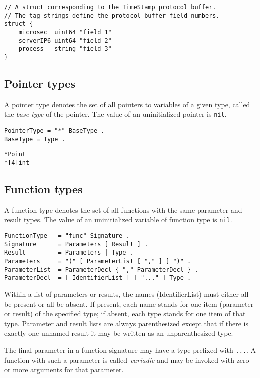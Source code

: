 \begin{Verbatim}[frame=single]
// A struct corresponding to the TimeStamp protocol buffer.
// The tag strings define the protocol buffer field numbers.
struct {
    microsec  uint64 "field 1"
    serverIP6 uint64 "field 2"
    process   string "field 3"
}
\end{Verbatim}

\subsection*{Pointer types}

A pointer type denotes the set of all pointers to variables of a given
type, called the \emph{base type} of the pointer. The value of an
uninitialized pointer is \texttt{nil}.

\begin{Verbatim}[frame=single]
PointerType = "*" BaseType .
BaseType = Type .
\end{Verbatim}

\begin{Verbatim}[frame=single]
*Point
*[4]int
\end{Verbatim}

\subsection*{Function types}

A function type denotes the set of all functions with the same parameter
and result types. The value of an uninitialized variable of function
type is \texttt{nil}.

\begin{Verbatim}[frame=single]
FunctionType   = "func" Signature .
Signature      = Parameters [ Result ] .
Result         = Parameters | Type .
Parameters     = "(" [ ParameterList [ "," ] ] ")" .
ParameterList  = ParameterDecl { "," ParameterDecl } .
ParameterDecl  = [ IdentifierList ] [ "..." ] Type .
\end{Verbatim}

Within a list of parameters or results, the names (IdentifierList) must
either all be present or all be absent. If present, each name stands for
one item (parameter or result) of the specified type; if absent, each
type stands for one item of that type. Parameter and result lists are
always parenthesized except that if there is exactly one unnamed result
it may be written as an unparenthesized type.

The final parameter in a function signature may have a type prefixed
with \texttt{...}. A function with such a parameter is called
\emph{variadic} and may be invoked with zero or more arguments for that
parameter.

